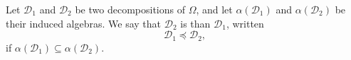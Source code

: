 Let $\mathcal{D}_1$ and $\mathcal{D}_2$ be two decompositions of $\Omega$, and let $\alpha(\mathcal{D}_1)$ and $\alpha(\mathcal{D}_2)$ be their induced algebras. We say that $\mathcal{D}_2$ is  than $\mathcal{D}_1$, written
$$\mathcal{D}_1 \preceq \mathcal{D}_2,$$
if $\alpha(\mathcal{D}_1) \subseteq \alpha(\mathcal{D}_2)$.
